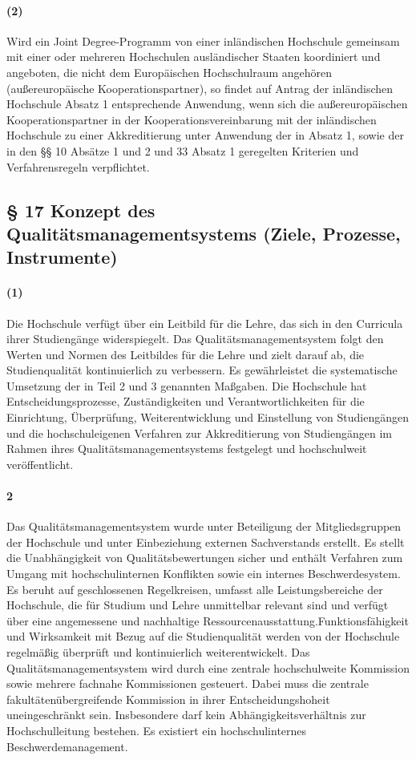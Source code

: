 \documentclass[a4paper]{scrartcl}
\begin{document}
\paragraph{(2)} Wird ein Joint Degree-Programm von einer inländischen Hochschule gemeinsam mit einer oder mehreren Hochschulen ausländischer Staaten koordiniert und angeboten, die nicht dem Europäischen Hochschulraum angehören (außereuropäische Kooperationspartner), so findet auf Antrag der inländischen Hochschule Absatz 1 entsprechende Anwendung, wenn sich die außereuropäischen Kooperationspartner in der Kooperationsvereinbarung mit der inländischen Hochschule zu einer Akkreditierung unter Anwendung der in Absatz 1, sowie der in den §§ 10 Absätze 1 und 2 und 33 Absatz 1 geregelten Kriterien und Verfahrensregeln verpflichtet.
\subsection{§ 17 Konzept des Qualitätsmanagementsystems (Ziele, Prozesse,
Instrumente)}
\paragraph{(1)} Die Hochschule verfügt über ein Leitbild für die Lehre, das sich in den Curricula ihrer Studiengänge widerspiegelt. Das Qualitätsmanagementsystem folgt den Werten und Normen des Leitbildes für die Lehre und zielt darauf ab, die Studienqualität kontinuierlich zu verbessern. Es gewährleistet die systematische Umsetzung der in Teil 2 und 3 genannten Maßgaben. Die Hochschule hat Entscheidungsprozesse, Zuständigkeiten und Verantwortlichkeiten für die Einrichtung, Überprüfung, Weiterentwicklung und Einstellung von Studiengängen und die hochschuleigenen Verfahren zur Akkreditierung von Studiengängen im Rahmen ihres Qualitätsmanagementsystems festgelegt und hochschulweit veröffentlicht.
\paragraph{2} Das Qualitätsmanagementsystem wurde unter Beteiligung der Mitgliedsgruppen der Hochschule und unter Einbeziehung externen Sachverstands erstellt. Es stellt die Unabhängigkeit von Qualitätsbewertungen sicher und enthält Verfahren zum Umgang mit
hochschulinternen Konflikten sowie ein internes Beschwerdesystem. Es beruht auf geschlossenen Regelkreisen, umfasst alle Leistungsbereiche der Hochschule, die für Studium und Lehre unmittelbar relevant sind und verfügt über eine angemessene und nachhaltige Ressourcenausstattung.Funktionsfähigkeit und Wirksamkeit mit Bezug auf die Studienqualität werden von der Hochschule regelmäßig überprüft und kontinuierlich weiterentwickelt.
\textcolor{Bernd}{\textbf{\cite{RESO: SoSe2013-SysAkk}}
Das Qualitätsmanagementsystem wird durch eine zentrale hochschulweite Kommission sowie mehrere fachnahe Kommissionen gesteuert. Dabei muss die zentrale fakultätenübergreifende Kommission in ihrer Entscheidungshoheit uneingeschränkt sein. Insbesondere darf kein Abhängigkeitsverhältnis zur Hochschulleitung bestehen.
Es existiert ein hochschulinternes Beschwerdemanagement.}
\end{document}
